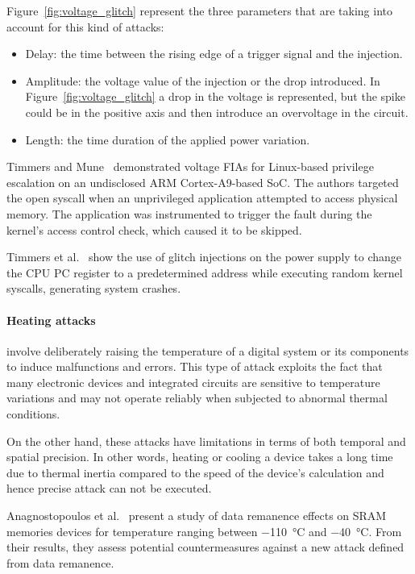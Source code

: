 Figure~\ref{fig:voltage_glitch} represent the three parameters that are taking into account for this kind of attacks:
\begin{itemize}
    \item Delay: the time between the rising edge of a trigger signal and the injection.
    \item Amplitude: the voltage value of the injection or the drop introduced. In Figure~\ref{fig:voltage_glitch} a drop in the voltage is represented, but the spike could be in the positive axis and then introduce an overvoltage in the circuit.
    \item Length: the time duration of the applied power variation.
\end{itemize}

Timmers and Mune~\cite{TM-17-fdtc} demonstrated voltage FIAs for Linux-based privilege escalation on an undisclosed ARM Cortex-A9-based SoC. The authors targeted the open syscall when an unprivileged application attempted to access physical memory. The application was instrumented to trigger the fault during the kernel’s access control check, which caused it to be skipped.

Timmers et al.~\cite{TSW-16-fdtc} show the use of glitch injections on the power supply to change the CPU PC register to a predetermined address while executing random kernel syscalls, generating system crashes.

\paragraph{Heating attacks} involve deliberately raising the temperature of a digital system or its components to induce malfunctions and errors. This type of attack exploits the fact that many electronic devices and integrated circuits are sensitive to temperature variations and may not operate reliably when subjected to abnormal thermal conditions.

On the other hand, these attacks have limitations in terms of both temporal and spatial precision. In other words, heating or cooling a device takes a long time due to thermal inertia compared to the speed of the device's calculation and hence precise attack can not be executed.

Anagnostopoulos et al.~\cite{AARSGK-18-dsd} present a study of data remanence effects on SRAM memories devices for temperature ranging between \SI{-110}{\degreeCelsius} and \SI{-40}{\degreeCelsius}. From their results, they assess potential countermeasures against a new attack defined from data remanence.

